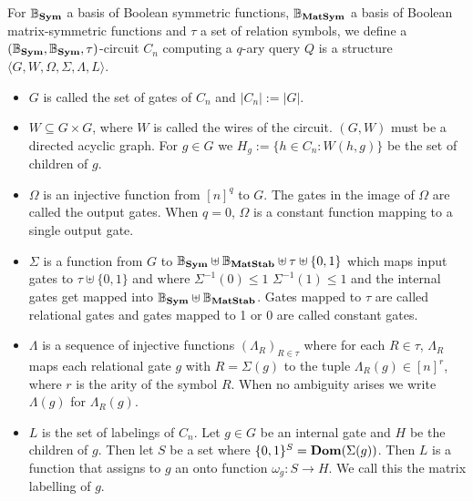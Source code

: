 \documentclass[12pt]{report}
\newcommand{\matstab}{\text{\textbf{MatStab}}}
\newcommand{\sym}{\text{\textbf{Sym}}}
\newcommand{\dom}{\text{\textbf{Dom}}}
\newcommand{\matsym}{\text{\textbf{MatSym}}}
\begin{document}
\begin{definition}
  For $\mathbb{B}_{\sym}$ a basis of Boolean symmetric functions,
  $\mathbb{B}_{\matsym}$ a basis of Boolean matrix-symmetric functions and
  $\tau$ a set of relation symbols, we define a $(\mathbb{B}_\sym,
  \mathbb{B}_\sym, \tau)$-circuit $C_n$ computing a $q$-ary query $Q$ is a
  structure $\langle G, W, \Omega, \Sigma, \Lambda, L\rangle$.
  \begin{itemize}
  \item $G$ is called the set of gates of $C_n$ and $\vert C_n \vert := \vert G
    \vert$.
  \item $W \subseteq G \times G$, where $W$ is called the wires of the circuit.
    $(G,W)$ must be a directed acyclic graph. For $g \in G$ we $H_g := \{ h \in
    C_n : W(h,g)\}$ be the set of children of $g$.
  \item $\Omega$ is an injective function from $[n]^q$ to $G$. The gates in the
    image of $\Omega$ are called the output gates. When $q = 0$, $\Omega$ is a
    constant function mapping to a single output gate.
  \item $\Sigma$ is a function from $G$ to $\mathbb{B}_\sym \uplus
    \mathbb{B}_\matstab \uplus \tau \uplus \{0,1\} $ which maps input gates to
    $\tau \uplus \{0,1\}$ and where $\Sigma^{-1} (0) \leq 1$ $\Sigma^{-1} (1)
    \leq 1$ and the internal gates get mapped into $\mathbb{B}_\sym \uplus
    \mathbb{B}_\matstab$. Gates mapped to $\tau$ are called relational gates and
    gates mapped to 1 or 0 are called constant gates.
  \item $\Lambda$ is a sequence of injective functions $(\Lambda_R)_{R \in
      \tau}$ where for each $R \in \tau$, $\Lambda_R$ maps each relational gate
    $g$ with $R = \Sigma (g)$ to the tuple $\Lambda_R (g) \in [n]^r$, where $r$
    is the arity of the symbol $R$. When no ambiguity arises we write $\Lambda
    (g)$ for $\Lambda_R (g)$.
  \item $L$ is the set of labelings of $C_n$. Let $g \in G$ be an internal gate
    and $H$ be the children of $g$. Then let $S$ be a set where $\{0,1\}^S =
    \dom(\Sigma (g))$. Then $L$ is a function that assigns to $g$ an onto
    function $\omega_g:S \rightarrow H$. We call this the matrix labelling of
    $g$.
  \end{itemize}
\end{definition}

\end{document}
